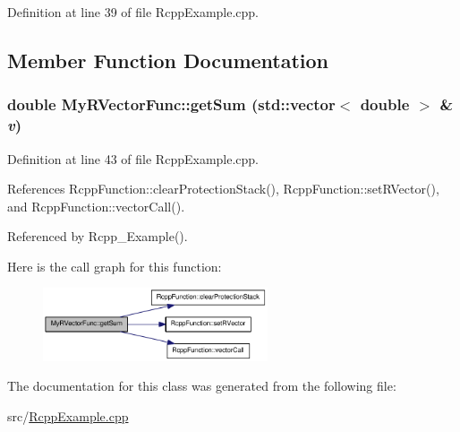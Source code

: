 Definition at line 39 of file RcppExample.cpp.

\subsection{Member Function Documentation}
\hypertarget{classMyRVectorFunc_a2eba5a390ca620a687e77208bfbb6df4}{
\subsubsection[{getSum}]{\setlength{\rightskip}{0pt plus 5cm}double MyRVectorFunc::getSum (std::vector$<$ double $>$ \& {\em v})}}
\label{classMyRVectorFunc_a2eba5a390ca620a687e77208bfbb6df4}


Definition at line 43 of file RcppExample.cpp.

References RcppFunction::clearProtectionStack(), RcppFunction::setRVector(), and RcppFunction::vectorCall().

Referenced by Rcpp\_\-Example().

Here is the call graph for this function:\nopagebreak
\begin{figure}[H]
\begin{center}
\leavevmode
\includegraphics[width=188pt]{classMyRVectorFunc_a2eba5a390ca620a687e77208bfbb6df4_cgraph}
\end{center}
\end{figure}


The documentation for this class was generated from the following file:\begin{DoxyCompactItemize}
\item 
src/\hyperlink{RcppExample_8cpp}{RcppExample.cpp}\end{DoxyCompactItemize}
